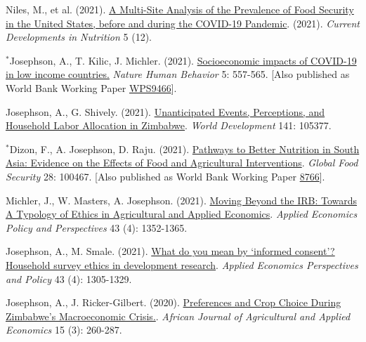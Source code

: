\documentclass[letterpaper]{article}
\begin{document}
\begin{etaremune}
\item Niles, M., et al. (2021). \href{https://academic.oup.com/cdn/article/5/12/nzab135/6415196}{A Multi-Site Analysis of the Prevalence of Food Security in the United States, before and during the COVID-19 Pandemic}. (2021). \emph{Current Developments in Nutrition} 5 (12). 

\item $^{*}$Josephson, A., T. Kilic, J. Michler. (2021). \href{https://www.nature.com/articles/s41562-021-01096-7}{Socioeconomic impacts of COVID-19 in low income countries.} \emph{Nature Human Behavior} 5: 557-565. [Also published as World Bank Working Paper \href{https://documents.worldbank.org/en/publication/documents-reports/documentdetail/955251604433596591/socioeconomic-impacts-of-covid-19-in-four-african-countries}{WPS9466}]. 
   	
\item Josephson, A., G. Shively. (2021). \href{https://www.sciencedirect.com/science/article/pii/S0305750X20305052}{Unanticipated Events, Perceptions, and Household Labor Allocation in Zimbabwe}. \emph{World Development} 141: 105377.   	
   	
\item $^{*}$Dizon, F., A. Josephson, D. Raju. (2021). \href{https://doi.org/10.1016/j.gfs.2020.100467}{Pathways to Better Nutrition in South Asia: Evidence on the Effects of Food and Agricultural Interventions}. \emph{Global Food Security} 28: 100467. [Also published as World Bank Working Paper \href{http://documents.worldbank.org/curated/en/945551551887112580/The-Nutrition-Sensitivity-of-Food-and-Agriculture-in-South-Asia}{8766}].

\item Michler, J., W. Masters, A. Josephson. (2021). \href{https://onlinelibrary.wiley.com/doi/10.1002/aepp.13132}{Moving Beyond the IRB: Towards A Typology of Ethics in Agricultural and Applied Economics}. \emph{Applied Economics Policy and Perspectives} 43 (4): 1352-1365.

\item Josephson, A., M. Smale. (2021). \href{https://onlinelibrary.wiley.com/doi/full/10.1002/aepp.13112}{What do you mean by `informed consent'? Household survey ethics in development research}. \emph{Applied Economics Perspectives and Policy} 43 (4): 1305-1329.

\item Josephson, A., J. Ricker-Gilbert. (2020).  \href{https://afjare.org/media/articles/6.-Josephson-Ricker-Gilbert.pdf}{Preferences and Crop Choice During Zimbabwe's Macroeconomic Crisis.}. \emph{African Journal of Agricultural and Applied Economics} 15 (3): 260-287. 


\end{etaremune}
\end{document}
